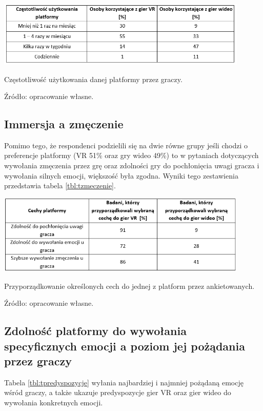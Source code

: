 \begin{table}[htb]
  \centering
  \includegraphics[width=0.9\textwidth]{images/tczestotliwosc.PNG}
  \caption{Częstotliwość użytkowania danej platformy przez graczy.}
  \caption*{Źródło: opracowanie własne.}
  \label{tbl:tczestotliwosc}
\end{table}

\subsection{Immersja a zmęczenie}

Pomimo tego, że respondenci podzielili się na dwie równe grupy jeśli chodzi o preferencje platformy (VR 51\% oraz gry wideo 49\%) to w pytaniach dotyczących wywołania zmęczenia przez grę oraz zdolności gry do pochłonięcia uwagi gracza i wywołania silnych emocji, większość była zgodna. Wyniki tego zestawienia przedstawia tabela \ref{tbl:tzmeczenie}.

\begin{table}[htb]
  \centering
  \includegraphics[width=0.9\textwidth]{images/tzmeczenie.PNG}
  \caption{Przyporządkowanie określonych cech do jednej z platform przez ankietowanych.}
  \caption*{Źródło: opracowanie własne.}
  \label{tbl:tzmeczenie}
\end{table}

\subsection{Zdolność platformy do wywołania specyficznych emocji a poziom jej pożądania przez graczy}

Tabela \ref{tbl:tpredyspozycje} wyłania najbardziej i najmniej pożądaną emocję wśród graczy, a także ukazuje predyspozycje gier VR oraz gier wideo do wywołania konkretnych emocji.

